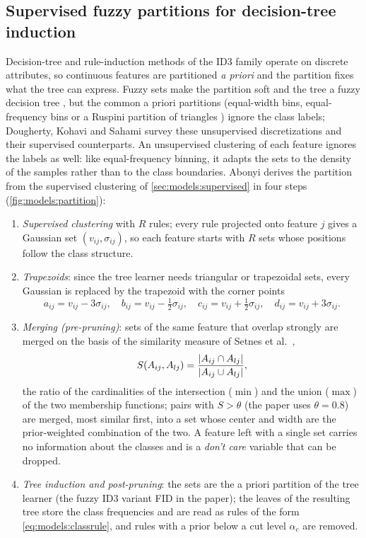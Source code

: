 \subsection{Supervised fuzzy partitions for decision-tree induction}\label{sec:models:partition}

Decision-tree and rule-induction methods of the ID3 family \cite{quinlan:1986:id3} operate on discrete attributes, so continuous features are partitioned \emph{a priori} and the partition fixes what the tree can express. Fuzzy sets make the partition soft and the tree a fuzzy decision tree \cite{janikow:1998:fid}, but the common a priori partitions (equal-width bins, equal-frequency bins or a Ruspini partition of triangles \cite{ruspini:1969}) ignore the class labels; Dougherty, Kohavi and Sahami \cite{dougherty:1995:discretization} survey these unsupervised discretizations and their supervised counterparts. An unsupervised clustering of each feature ignores the labels as well: like equal-frequency binning, it adapts the sets to the density of the samples rather than to the class boundaries. Abonyi \cite{abonyi:2010:partition} derives the partition from the supervised clustering of \cref{sec:models:supervised} in four steps (\cref{fig:models:partition}):
\begin{enumerate}
  \item \emph{Supervised clustering} with $R$ rules; every rule projected onto feature $j$ gives a Gaussian set $(v_{ij},\sigma_{ij})$, so each feature starts with $R$ sets whose positions follow the class structure.
  \item \emph{Trapezoids}: since the tree learner needs triangular or trapezoidal sets, every Gaussian is replaced by the trapezoid with the corner points
  \begin{equation}
    a_{ij}=v_{ij}-3\sigma_{ij},\quad b_{ij}=v_{ij}-\tfrac12\sigma_{ij},\quad c_{ij}=v_{ij}+\tfrac12\sigma_{ij},\quad d_{ij}=v_{ij}+3\sigma_{ij}.
    \label{eq:models:trapezoid}
  \end{equation}
  \item \emph{Merging (pre-pruning)}: sets of the same feature that overlap strongly are merged on the basis of the similarity measure of Setnes et al.\ \cite{setnes:1998:similarity},
  \begin{equation}
    S(A_{ij},A_{lj})=\frac{\left\lvert A_{ij}\cap A_{lj} \right\rvert}{\left\lvert A_{ij}\cup A_{lj} \right\rvert},
    \label{eq:models:similarity}
  \end{equation}
  the ratio of the cardinalities of the intersection ($\min$) and the union ($\max$) of the two membership functions; pairs with $S>\theta$ (the paper uses $\theta=0.8$) are merged, most similar first, into a set whose center and width are the prior-weighted combination of the two. A feature left with a single set carries no information about the classes and is a \emph{don't care} variable that can be dropped.
  \item \emph{Tree induction and post-pruning}: the sets are the a priori partition of the tree learner (the fuzzy ID3 variant FID in the paper); the leaves of the resulting tree store the class frequencies and are read as rules of the form \eqref{eq:models:classrule}, and rules with a prior below a cut level $\alpha_c$ are removed.
\end{enumerate}

